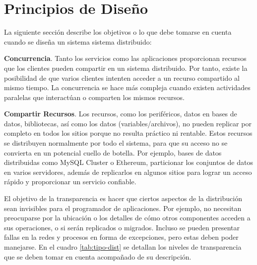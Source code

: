\section{Principios de Dise\~no }
\label{sec:principio-SD}

La siguiente secci\'on describe los objetivos  o lo  que debe tomarse en cuenta cuando se  dise\~na un sistema sistema distribuido: 

\begin{description} 
	
	\item {\textbf{Concurrencia}.}  Tanto los servicios como las aplicaciones proporcionan recursos que los clientes pueden compartir en un sistema distribuido. Por tanto, existe la posibilidad de que varios clientes intenten acceder a un recurso compartido al mismo tiempo. La concurrencia se hace más compleja cuando existen  actividades paralelas que interactúan o comparten los mismos recursos. 
	
	\item {\textbf{Compartir Recursos}.}  Los \gls{recursos}, como los  periféricos,  datos en bases de datos,  bibliotecas, así como los datos (variables/archivos),  no pueden replicar por completo en todos los sitios porque no resulta pr\'actico ni rentable. Estos recursos se distribuyen normalmente por todo el sistema, para que su acceso no se convierta en un potencial cuello de botella.
	Por ejemplo, bases de datos distribuidas como MySQL Cluster o Ethereum, particionar los conjuntos de datos en varios servidores, además de replicarlos en algunos sitios para lograr un acceso rápido y proporcionar un servicio confiable. 

	\item[{\textbf{Transparencia}.}]     El objetivo de la \gls{transparencia} es hacer que ciertos aspectos de la distribución sean invisibles para el programador de aplicaciones. Por ejemplo, no necesitan preocuparse por la ubicación o los detalles de cómo otros componentes acceden a sus operaciones, o si serán replicados o migrados. Incluso se pueden presentar fallas en la redes y procesos  en forma de excepciones, pero estas deben poder manejarse.  En el cuadro \ref{tab:tipo-dist} se detallan los niveles de transparencia que se deben tomar en cuenta acompañado de su descripción. 
	

\end{description}

